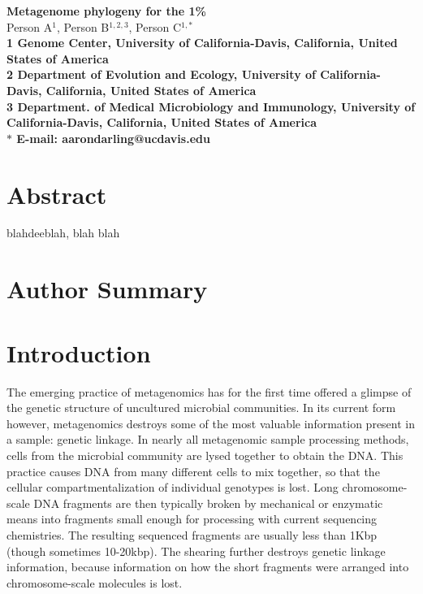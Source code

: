 \documentclass[10pt]{article}
\date{}
\begin{document}
\begin{flushleft}
{\Large
\textbf{Metagenome phylogeny for the 1\%}
}
\\
Person A$^{1}$, 
Person B$^{1,2,3}$, 
Person C$^{1,\ast}$
\\
\bf{1} Genome Center, University of California-Davis, California, United States of America
\\
\bf{2} Department of Evolution and Ecology, University of California-Davis, California, United States of America
\\
\bf{3} Department. of Medical Microbiology and Immunology, University of California-Davis, California, United States of America
\\
$\ast$ E-mail: aarondarling@ucdavis.edu
\end{flushleft}

\section*{Abstract}
blahdeeblah, blah blah
\section*{Author Summary}

\section*{Introduction}

The emerging practice of metagenomics has for the first time offered a glimpse of the genetic structure of uncultured microbial communities.
In its current form however, metagenomics destroys some of the most valuable information present in a sample: genetic linkage.
In nearly all metagenomic sample processing methods, cells from the microbial community are lysed together to obtain the DNA.
This practice causes DNA from many different cells to mix together, so that the cellular compartmentalization of individual genotypes is lost.
Long chromosome-scale DNA fragments are then typically broken by mechanical or enzymatic means into fragments small enough for processing with current sequencing chemistries. 
The resulting sequenced fragments are usually less than 1Kbp (though sometimes 10-20kbp). 
The shearing further destroys genetic linkage information, because information on how the short fragments were arranged into chromosome-scale molecules is lost.
\end{document}

